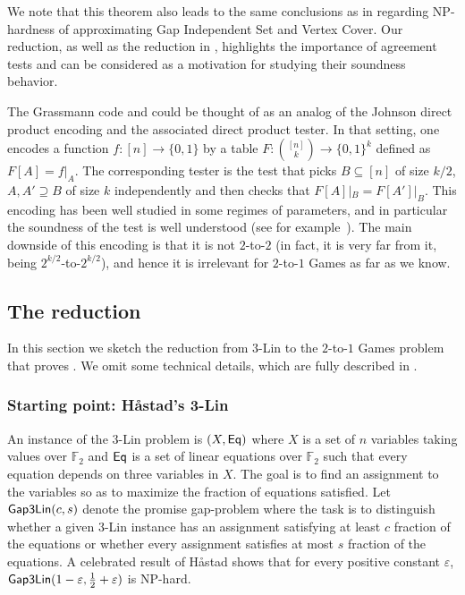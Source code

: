 \documentclass{toc}
\newcommand\eps{\varepsilon}
\begin{document}
We note that this theorem also leads to the same conclusions as in \cite{KMS} regarding NP-hardness of approximating %
%
%
Gap Independent Set and Vertex Cover.  %
Our reduction, as well as the reduction in  \cite{KMS}, highlights the
importance of agreement tests and can be considered as a motivation for studying
their soundness behavior.

\begin{remark}
  The Grassmann code and  could be thought of as an analog of the Johnson direct product encoding and the associated direct product tester. In that setting, one encodes a function $f\colon [n]\to\{0,1\}$ by a table $F\colon \binom{[n]}{k}\to\{0,1\}^k$ defined
  as $F[A] = f|_{A}$. The corresponding tester is the test that picks $B\subseteq [n]$ of size $k/2$, $A,A'\supseteq B$ of size $k$ independently
  and then checks that $F[A]|_{B} = F[A']|_{B}$. This encoding has been well studied in some regimes of parameters, and in particular the soundness
  of the test is well understood (see for example~\cite{IKW}). The main downside of this encoding is that it is not $2$-to-$2$ (in fact, it is
  very far from it, being $2^{k/2}$-to-$2^{k/2}$), and hence it is irrelevant for $2$-to-$1$ Games as far as we know.
\end{remark}


\subsection{The reduction}
In this section we sketch the reduction from $3$-Lin to the $2$-to-$1$ Games problem that
proves . We omit some technical details, which are fully described in .

\subsubsection{Starting point: H\aa stad's 3-Lin}
An instance of the $3$-Lin problem is
$(X, {\sf Eq})$ where $X$ is a set of $n$ variables taking values over ${\mathbb F}_2$ and ${\sf Eq}$ is a set of linear equations over
${\mathbb F}_2$ such that every equation depends on three variables in $X$. The goal is to find an assignment to the variables
so as to maximize the fraction of equations satisfied. Let ${\sf Gap3Lin}(c, s)$ denote the promise gap-problem
where the task is to distinguish whether a given $3$-Lin instance has an assignment satisfying at least $c$ fraction of
the equations or whether every assignment satisfies at most $s$ fraction of the equations.
A celebrated result of H\aa stad \cite{Has01} shows that for every positive constant $\eps$,
 ${\sf Gap3Lin}(1-\eps, \frac{1}{2}+\eps)$ is NP-hard.
\end{document}
